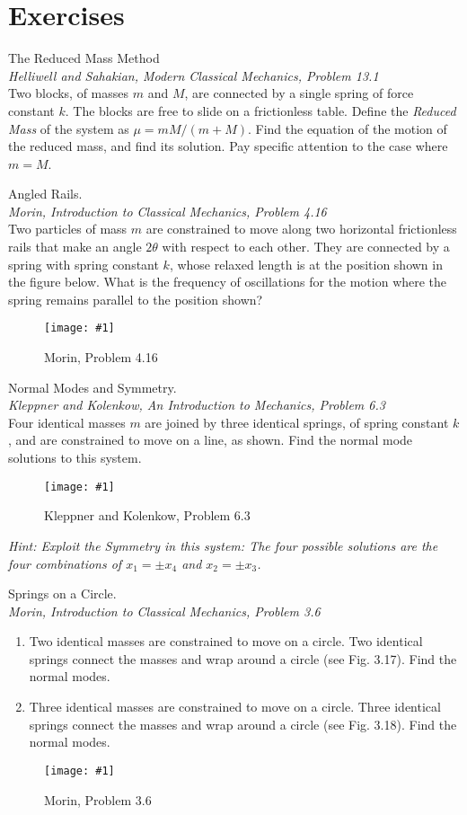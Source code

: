 \documentclass[11pt]{article}
\newcommand{\fig}[4]{
    \begin{figure}[H]
        \centering
        \texttt{[image: \#1]}
        \caption{#2}
        \label{exp4fit}
    \end{figure}
}
\theoremstyle{gangnamstyle}{\newtheorem{definition}{Definition}[]}
\theoremstyle{gangnamstyle}{\newtheorem{example}{Example}[]}
\theoremstyle{gangnamstyle}{\newtheorem{problem}{Problem}[]}
\theoremstyle{gangnamstyle}{\newtheorem{warning}{Warning}[]}
\begin{document}
\pagebreak

\section{Exercises}
\begin{problem}
The Reduced Mass Method \\
\textit{Helliwell and Sahakian, Modern Classical Mechanics, Problem 13.1} \\
Two blocks, of masses $m$ and $M$, are connected by a single spring of force constant $k$. The blocks are free to slide on a frictionless table. Define the \textit{Reduced Mass} of the system as $\mu = mM / (m + M)$. Find the equation of the motion of the reduced mass, and find its solution. Pay specific attention to the case where $m = M$. 
\end{problem}

\begin{problem}
Angled Rails. \\
\textit{Morin, Introduction to Classical Mechanics, Problem 4.16} \\
Two particles of mass $m$ are constrained to move along two horizontal frictionless rails that make an angle $2\theta$ with respect to each other. They are connected by a spring with spring constant $k$, whose relaxed length is at the position shown in the figure below. What is the frequency of oscillations for the motion where the spring remains parallel to the position
shown?
\fig{figs/n3/angled.jpg}{Morin, Problem 4.16}{0.5}{0}
\end{problem}

\begin{problem}
Normal Modes and Symmetry. \\
\textit{Kleppner and Kolenkow, An Introduction to Mechanics, Problem 6.3} \\
Four identical masses $m$ are joined by three identical springs, of spring constant $k$, and are constrained to move on a line, as shown. Find the normal mode solutions to this system. 
\fig{figs/n3/kk.jpg}{Kleppner and Kolenkow, Problem 6.3}{0.5}{0}
\textit{Hint: Exploit the Symmetry in this system: The four possible solutions are the four combinations of $x_1 = \pm x_4$ and $x_2 = \pm x_3$. }
\end{problem}

\begin{problem}
Springs on a Circle. \\
\textit{Morin, Introduction to Classical Mechanics, Problem 3.6} \\
\begin{enumerate}
\item Two identical masses are constrained to move on a circle. Two identical springs connect the masses and wrap around a circle (see Fig. 3.17). Find the normal modes.
\item Three identical masses are constrained to move on a circle. Three identical springs connect the masses and wrap around a circle (see Fig. 3.18). Find the normal modes.
\end{enumerate}
\fig{figs/n3/morin.jpg}{Morin, Problem 3.6}{0.4}{0}
\end{problem}
\end{document}
